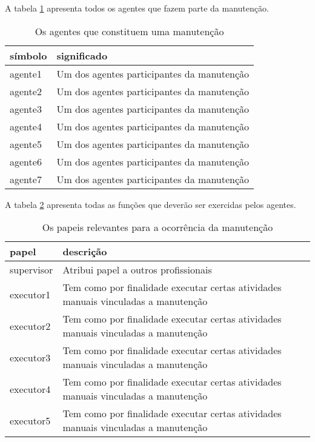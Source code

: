 A tabela \ref{agents} apresenta todos os agentes que fazem parte da manutenção. 
\begin{table}[H]
\centering
\begin{tabular}{|l|l|}
\hline
\textbf{símbolo} & \textbf{significado} \\ \hline
agente1 & Um dos agentes participantes da manutenção \\ \hline
agente2 & Um dos agentes participantes da manutenção \\ \hline
agente3 & Um dos agentes participantes da manutenção \\ \hline
agente4 & Um dos agentes participantes da manutenção \\ \hline
agente5 & Um dos agentes participantes da manutenção \\ \hline
agente6 & Um dos agentes participantes da manutenção \\ \hline
agente7 & Um dos agentes participantes da manutenção \\ \hline
\end{tabular}
\caption{Os agentes que constituem uma manutenção}
\label{agents}
\end{table}

 A tabela \ref{roles} apresenta todas as funções que deverão ser exercidas pelos agentes.

\begin{table}[H]
\centering
\begin{tabular}{|l|l|}
\hline
\textbf{papel} & \textbf{descrição} \\ \hline
supervisor & Atribui papel a outros profissionais \\ \hline
executor1 & Tem como por finalidade executar certas atividades manuais vinculadas a manutenção \\ \hline
executor2 & Tem como por finalidade executar certas atividades manuais vinculadas a manutenção \\ \hline
executor3 & Tem como por finalidade executar certas atividades manuais vinculadas a manutenção \\ \hline
executor4 & Tem como por finalidade executar certas atividades manuais vinculadas a manutenção \\ \hline
executor5 & Tem como por finalidade executar certas atividades manuais vinculadas a manutenção \\ \hline
\end{tabular}
\caption{Os papeis relevantes para a ocorrência da manutenção}
\label{roles}
\end{table}

